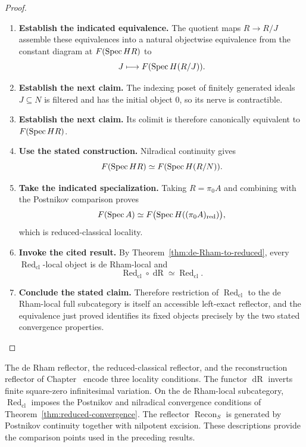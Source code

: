 \begin{proof}
\begin{enumerate}[label=\textup{(\arabic*)}]
\[    F(\Spec HR)
    \simeq
    F(\Spec H(R/J)).
    \]
    \item \textbf{Establish the indicated equivalence.}
    The quotient maps \(R\to R/J\) assemble these equivalences into a natural
    objectwise equivalence from the constant diagram at \(F(\operatorname{Spec} HR)\) to
    \[
    J\longmapsto F(\operatorname{Spec} H(R/J)).
    \]
    \item \textbf{Establish the next claim.}
    The indexing poset of finitely generated ideals \(J\subseteq N\) is filtered and
    has the initial object \(0\), so its nerve is contractible.
    \item \textbf{Establish the next claim.}
    Its colimit is
    therefore canonically equivalent to \(F(\operatorname{Spec} HR)\).
    \item \textbf{Use the stated construction.}
    Nilradical continuity gives
    \[
    F(\operatorname{Spec} HR)
    \simeq
    F(\operatorname{Spec} H(R/N)).
    \]
    \item \textbf{Take the indicated specialization.}
    Taking \(R=\pi_0A\) and combining with the Postnikov comparison proves
    \[
    F(\operatorname{Spec} A)
    \simeq
    F\bigl(\operatorname{Spec} H((\pi_0A)_{\mathrm{red}})\bigr),
    \]
    which is reduced-classical locality.
    \item \textbf{Invoke the cited result.}
    By Theorem~\ref{thm:de-Rham-to-reduced}, every
    \(\operatorname{Red}_{\mathrm{cl}}\)-local object is de Rham-local and
    \[
    \operatorname{Red}_{\mathrm{cl}}\circ\operatorname{dR}
    \simeq
    \operatorname{Red}_{\mathrm{cl}}.
    \]
    \item \textbf{Conclude the stated claim.}
    Therefore restriction of \(\operatorname{Red}_{\mathrm{cl}}\) to the de
    Rham-local full subcategory is itself an accessible left-exact reflector, and
    the equivalence just proved identifies its fixed objects precisely by the two
    stated convergence properties.
\end{enumerate}
\end{proof}

\begin{remark}
\label{rem:de-Rham-reduced-reconstruction-distinction}
The de Rham reflector, the reduced-classical reflector, and the reconstruction
reflector of Chapter~ encode
three locality conditions. The functor \(\operatorname{dR}\) inverts finite
square-zero infinitesimal variation. On the de Rham-local subcategory,
\(\operatorname{Red}_{\mathrm{cl}}\) imposes the Postnikov and nilradical
convergence conditions of Theorem~\ref{thm:reduced-convergence}. The reflector
\(\operatorname{Recon}_S\) is generated by Postnikov continuity together with
nilpotent excision. These descriptions provide the comparison points
used in the preceding results.
\end{remark}

